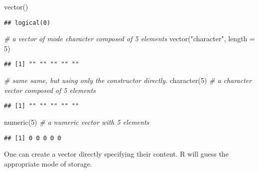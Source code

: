 \documentclass[
]{article}
\newenvironment{Shaded}{\begin{snugshade}}{\end{snugshade}}
\newcommand{\AttributeTok}[1]{\textcolor[rgb]{0.77,0.63,0.00}{#1}}
\newcommand{\CommentTok}[1]{\textcolor[rgb]{0.56,0.35,0.01}{\textit{#1}}}
\newcommand{\DecValTok}[1]{\textcolor[rgb]{0.00,0.00,0.81}{#1}}
\newcommand{\FunctionTok}[1]{\textcolor[rgb]{0.00,0.00,0.00}{#1}}
\newcommand{\NormalTok}[1]{#1}
\newcommand{\StringTok}[1]{\textcolor[rgb]{0.31,0.60,0.02}{#1}}
\begin{document}
\begin{Shaded}
\begin{Highlighting}[]
\FunctionTok{vector}\NormalTok{()}
\end{Highlighting}
\end{Shaded}

\begin{verbatim}
## logical(0)
\end{verbatim}

\begin{Shaded}
\begin{Highlighting}[]
\CommentTok{\# a vector of mode \textquotesingle{}character\textquotesingle{} composed of 5 elements}
\FunctionTok{vector}\NormalTok{(}\StringTok{"character"}\NormalTok{, }\AttributeTok{length =} \DecValTok{5}\NormalTok{) }
\end{Highlighting}
\end{Shaded}

\begin{verbatim}
## [1] "" "" "" "" ""
\end{verbatim}

\begin{Shaded}
\begin{Highlighting}[]
\CommentTok{\# same same, but using only the constructor directly.}
\FunctionTok{character}\NormalTok{(}\DecValTok{5}\NormalTok{) }\CommentTok{\# a \textquotesingle{}character\textquotesingle{} vector composed of 5 elements}
\end{Highlighting}
\end{Shaded}

\begin{verbatim}
## [1] "" "" "" "" ""
\end{verbatim}

\begin{Shaded}
\begin{Highlighting}[]
\FunctionTok{numeric}\NormalTok{(}\DecValTok{5}\NormalTok{)   }\CommentTok{\# a \textquotesingle{}numeric\textquotesingle{} vector with 5 elements}
\end{Highlighting}
\end{Shaded}

\begin{verbatim}
## [1] 0 0 0 0 0
\end{verbatim}

One can create a vector directly specifying their content. R will guess
the appropriate mode of storage.
\end{document}
